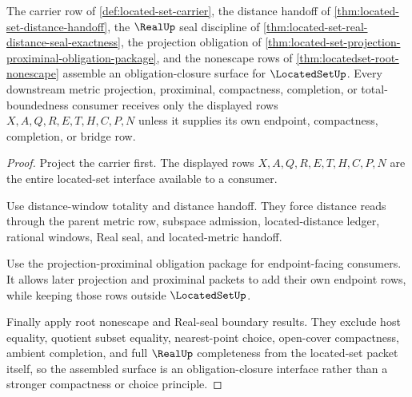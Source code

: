 \begin{theorem}
\label{thm:located-set-obligation-consumer-nonescape-assembly}
The carrier row of \autoref{def:located-set-carrier}, the distance handoff of \autoref{thm:located-set-distance-handoff}, the $\RealUp$ seal discipline of \autoref{thm:located-set-real-distance-seal-exactness}, the projection obligation of \autoref{thm:located-set-projection-proximinal-obligation-package}, and the nonescape rows of \autoref{thm:locatedset-root-nonescape} assemble an obligation-closure surface for $\LocatedSetUp$. Every downstream metric projection, proximinal, compactness, completion, or total-boundedness consumer receives only the displayed rows $X,A,Q,R,E,T,H,C,P,N$ unless it supplies its own endpoint, compactness, completion, or bridge row.
\end{theorem}
\begin{proof}
Project the carrier first. The displayed rows $X,A,Q,R,E,T,H,C,P,N$ are the entire located-set interface available to a consumer.

Use distance-window totality and distance handoff. They force distance reads through the parent metric row, subspace admission, located-distance ledger, rational windows, Real seal, and located-metric handoff.

Use the projection-proximinal obligation package for endpoint-facing consumers. It allows later projection and proximinal packets to add their own endpoint rows, while keeping those rows outside $\LocatedSetUp$.

Finally apply root nonescape and Real-seal boundary results. They exclude host equality, quotient subset equality, nearest-point choice, open-cover compactness, ambient completion, and full $\RealUp$ completeness from the located-set packet itself, so the assembled surface is an obligation-closure interface rather than a stronger compactness or choice principle.
\end{proof}


